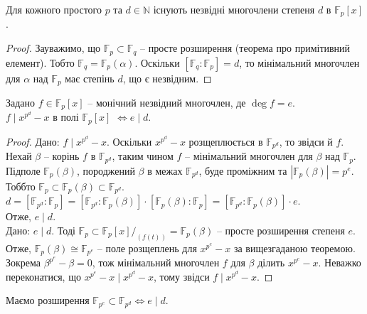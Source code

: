 \documentclass{math_library}
\begin{document}
\begin{corollary}
Для кожного простого $p$ та $d \in \mathbb{N}$ існують незвідні многочлени степеня $d$ в $\mathbb{F}_p[x]$.
\end{corollary}

\begin{proof}
Зауважимо, що $\mathbb{F}_p \subset \mathbb{F}_q$ -- просте розширення (теорема про примітивний елемент). Тобто $\mathbb{F}_q = \mathbb{F}_p(\alpha)$. Оскільки $[\mathbb{F}_q : \mathbb{F}_p] = d$, то мінімальний многочлен для $\alpha$ над $\mathbb{F}_p$ має степінь $d$, що є незвідним.
\end{proof}

\begin{proposition}
Задано $f \in \mathbb{F}_p[x]$ -- монічний незвідний многочлен, де $\deg f = e$.\\
$f \mid x^{p^d} - x$ в полі $\mathbb{F}_p[x]$ $\iff e \mid d$.

\end{proposition}

\begin{proof}
\rightproof Дано: $f \mid x^{p^d} - x$. Оскільки $x^{p^d} - x$ розщеплюється в $\mathbb{F}_{p^d}$, то звідси й $f$. Нехай $\beta$ -- корінь $f$ в $\mathbb{F}_{p^d}$, таким чином $f$ -- мінімальний многочлен для $\beta$ над $\mathbb{F}_p$. Підполе $\mathbb{F}_p(\beta)$, породжений $\beta$ в межах $\mathbb{F}_{p^d}$, буде проміжним та $|\mathbb{F}_p(\beta)| = p^e$. Тоббто $\mathbb{F}_p \subset \mathbb{F}_p(\beta) \subset \mathbb{F}_{p^d}$.\\
$d = [\mathbb{F}_{p^d} : \mathbb{F}_p] = [\mathbb{F}_{p^d} : \mathbb{F}_p(\beta)] \cdot [\mathbb{F}_p(\beta) : \mathbb{F}_p] = [\mathbb{F}_{p^d} : \mathbb{F}_p(\beta)] \cdot e$.\\
Отже, $e \mid d$.
\bigskip \\
\leftproof Дано: $e \mid d$. Тоді $\mathbb{F}_p \subset \mathbb{F}_p[x]/_{(f(t))} = \mathbb{F}_p(\beta)$ -- просте розширення степеня $e$. Отже, $\mathbb{F}_p(\beta) \cong \mathbb{F}_{p^e}$ -- поле розщеплень для $x^{p^e} - x$ за вищезгаданою теоремою. Зокрема $\beta^{p^e} - \beta = 0$, тож мінімальний многочлен $f$ для $\beta$ ділить $x^{p^e} - x$. Неважко переконатися, що $x^{p^e} - x \mid x^{p^d} - x$, тому звідси $f \mid x^{p^d} - x$.
\end{proof}

\begin{corollary}
Маємо розширення $\mathbb{F}_{p^e} \subset \mathbb{F}_{p^d} \iff e \mid d$.
\end{corollary}
\newpage
\end{document}
